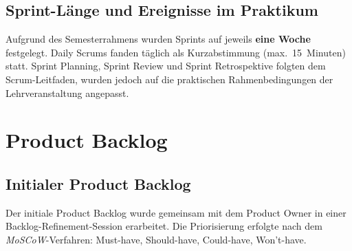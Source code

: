 \documentclass[12pt, a4paper, twoside]{report}
\begin{document}
\section{Sprint-Länge und Ereignisse im Praktikum}

Aufgrund des Semesterrahmens wurden Sprints auf jeweils \textbf{eine Woche} festgelegt.
Daily Scrums fanden täglich als Kurzabstimmung (max.\ 15~Minuten) statt. Sprint Planning,
Sprint Review und Sprint Retrospektive folgten dem Scrum-Leitfaden, wurden jedoch auf
die praktischen Rahmenbedingungen der Lehrveranstaltung angepasst.

\chapter{Product Backlog}
\label{chap:backlog}

\section{Initialer Product Backlog}

Der initiale Product Backlog wurde gemeinsam mit dem Product Owner in einer
Backlog-Refinement-Session erarbeitet. Die Priorisierung erfolgte nach dem
\textit{MoSCoW}-Verfahren: Must-have, Should-have, Could-have, Won't-have.
\end{document}
